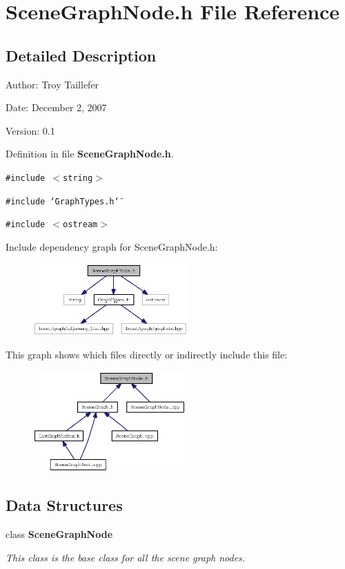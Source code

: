 \section{SceneGraphNode.h File Reference}
\label{SceneGraphNode_8h}


\subsection{Detailed Description}
\begin{Desc}
\item[Author:]Troy Taillefer \end{Desc}


\begin{Desc}
\item[Date:]December 2, 2007 \end{Desc}
\begin{Desc}
\item[Version:]0.1 \end{Desc}


Definition in file {\bf SceneGraphNode.h}.

{\tt \#include $<$string$>$}\par
{\tt \#include \char`\"{}GraphTypes.h\char`\"{}}\par
{\tt \#include $<$ostream$>$}\par


Include dependency graph for SceneGraphNode.h:\nopagebreak
\begin{figure}[H]
\begin{center}
\leavevmode
\includegraphics[width=168pt]{SceneGraphNode_8h__incl}
\end{center}
\end{figure}


This graph shows which files directly or indirectly include this file:\nopagebreak
\begin{figure}[H]
\begin{center}
\leavevmode
\includegraphics[width=166pt]{SceneGraphNode_8h__dep__incl}
\end{center}
\end{figure}
\subsection*{Data Structures}
\begin{CompactItemize}
\item 
class {\bf SceneGraphNode}
\begin{CompactList}\small\item\em This class is the base class for all the scene graph nodes. \item\end{CompactList}\end{CompactItemize}
